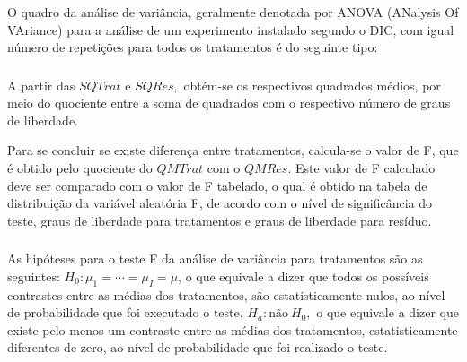 \documentclass[14pt,aspectratio=1610]{beamer}
\begin{document}
\begin{frame}{}
\frametitle{}
\begin{block}{}
\justifying
O quadro da análise de variância, geralmente denotada por ANOVA (ANalysis Of
VAriance) para a análise de um experimento instalado segundo o DIC, com igual número
de repetições para todos os tratamentos é do seguinte tipo:
\begin{table}[!h]
\end{table}
\end{block}
\end{frame}

\begin{frame}{}
\frametitle{}
\begin{block}{}
\justifying
A partir das $SQTrat$ e $SQRes,$ obtém-se os respectivos quadrados médios, por
meio do quociente entre a soma de quadrados com o respectivo número de graus de
liberdade.
\end{block}
\pause
\begin{block}{}
\justifying
Para se concluir se existe diferença entre tratamentos, calcula-se o valor de F, que
é obtido pelo quociente do $QMTrat$ com o $QMRes.$ Este valor de F calculado deve ser
comparado com o valor de F tabelado, o qual é obtido na tabela de distribuição da
variável aleatória F, de acordo com o nível de significância do teste, graus de liberdade para tratamentos e graus de liberdade para resíduo.
\end{block}
\end{frame}

\begin{frame}{}
\frametitle{}
\begin{block}{}
\justifying
As hipóteses para o teste F da análise de variância para tratamentos são as
seguintes:
$H_{0}:\mu_{1}=\cdots=\mu_{I}=\mu$, o que equivale a dizer que todos os possíveis contrastes entre as médias dos tratamentos, são estatisticamente nulos, ao nível de
probabilidade que foi executado o teste.\pause
$H_{a}:\textrm{não}\ H_{0},$ o que equivale a dizer que existe pelo menos um contraste entre as médias dos tratamentos, estatisticamente diferentes de zero, ao nível de probabilidade que foi realizado o teste.
\end{block}
\end{frame}
\end{document}
